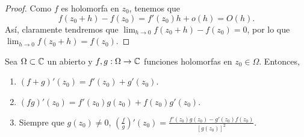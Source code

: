 \begin{proof}
Como $\displaystyle f $ es holomorfa en $\displaystyle z_{0} $, tenemos que
\[f\left(z_{0}+h\right)-f\left(z_{0}\right)=f'\left(z_{0}\right)h + o\left(h\right)= O\left(h\right) .\]
Así, claramente tendremos que $\displaystyle \lim_{h \to 0}f\left(z_{0} + h\right)-f\left(z_{0}\right)=0 $, por lo que $\displaystyle \lim_{h \to 0}f\left(z_{0}+h\right)=f\left(z_{0}\right) $. 
\end{proof}
\begin{prop}
Sea $\displaystyle \Omega \subset \mathbb{C} $ un abierto y $\displaystyle f,g : \Omega \to \mathbb{C} $ funciones holomorfas en $\displaystyle z_{0} \in \Omega  $. Entonces, 
\begin{enumerate}
	\item $\displaystyle \left(f + g\right)'\left(z_{0}\right)=f'\left(z_{0}\right)+g'\left(z_{0}\right) $.
	\item $\displaystyle \left(fg\right)'\left(z_{0}\right)=f'\left(z_{0}\right)g\left(z_{0}\right)+f\left(z_{0}\right)g'\left(z_{0}\right) $. 
	\item Siempre que $\displaystyle g\left(z_{0}\right)\neq 0 $, $\displaystyle \left(\frac{f}{g}\right)'\left(z_{0}\right)=\frac{f'\left(z_{0}\right)g\left(z_{0}\right)-g'\left(z_{0}\right)f\left(z_{0}\right)}{\left[g\left(z_{0}\right)\right] ^{2}} $.
\end{enumerate}
\end{prop}
